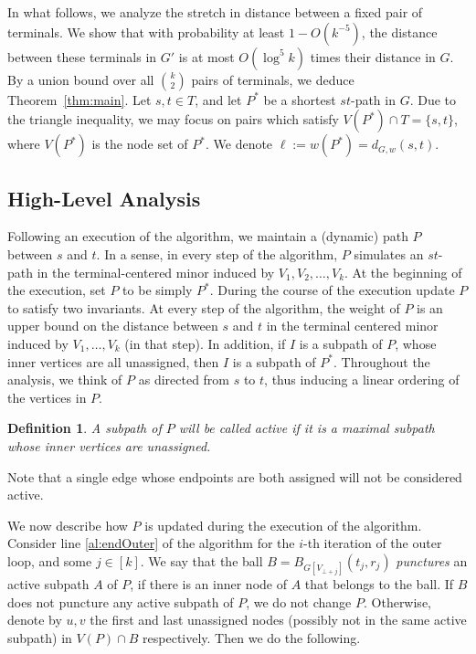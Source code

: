 \documentclass[twoside,leqno,twocolumn]{article}
\newtheorem{definition}[Definition]{Definition}
\newtheorem{definition}[theorem]{Definition}
\providecommand{\eqdef}{:=}
\begin{document}
In what follows, we analyze the stretch in distance between a fixed pair of terminals. We show that with probability at least $1 - O(k^{-5})$, the distance between these terminals in $G'$ is at most $O(\log ^5 k)$ times their distance in $G$. By a union bound over all $\binom{k}{2}$ pairs of terminals, we deduce Theorem~\ref{thm:main}.
Let $s,t \in T$, and let $P^*$ be a shortest $st$-path in $G$. Due to the triangle inequality, we may focus on pairs which satisfy $V(P^*) \cap T = \{s,t\}$, where $V(P^*)$ is the node set of $P^*$. We denote $\ell \eqdef w(P^*) = d_{G,w}(s,t)$.

\subsection{High-Level Analysis}
Following an execution of the algorithm, we maintain a (dynamic) path $P$ between $s$ and $t$. In a sense, in every step of the algorithm, $P$ simulates an $st$-path in the terminal-centered minor induced by $V_1,V_2,\ldots,V_k$. At the beginning of the execution, set $P$ to be simply $P^*$. During the course of the execution update $P$ to satisfy two invariants. At every step of the algorithm, the weight of $P$ is an upper bound on the distance between $s$ and $t$ in the terminal centered minor induced by $V_1,\ldots, V_k$ (in that step). In addition, if $I$ is a subpath of $P$, whose inner vertices are all unassigned, then $I$ is a subpath of $P^*$. Throughout the analysis, we think of $P$ as directed from $s$ to $t$, thus inducing a linear ordering of the vertices in $P$. 

\begin{definition}
A subpath of $P$ will be called {\em active} if it is a maximal subpath whose inner vertices are unassigned.
\end{definition}

Note that a single edge whose endpoints are both assigned will not be considered active.

We now describe how $P$ is updated during the execution of the algorithm. Consider line \ref{al:endOuter} of the algorithm for the $i$-th iteration of the outer loop, and some $j \in [k]$. We say that the ball $B=B_{G[V_{\bot+j}]}(t_j,r_j)$ {\em punctures} an active subpath $A$ of $P$, if there is an inner node of $A$ that belongs to the ball.
If $B$ does not puncture any active subpath of $P$, we do not change $P$. Otherwise, denote by $u,v$ the first and last unassigned nodes (possibly not in the same active subpath) in $V(P) \cap B$ respectively. Then we do the following.
\end{document}

